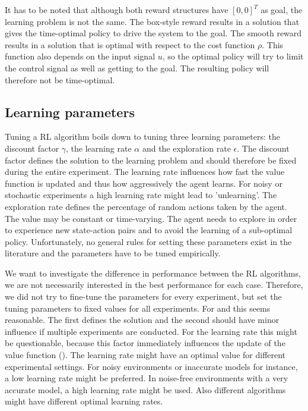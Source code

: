 It has to be noted that although both reward structures have $[0, 0]^T$ as goal, the learning problem is not the same. The box-style reward results in a solution that gives the time-optimal policy to drive the system to the goal. The smooth reward results in a solution that is optimal with respect to the cost function $\rho$. This function also depends on the input signal $u$, so the optimal policy will try to limit the control signal as well as getting to the goal. The resulting policy will therefore not be time-optimal.



\subsection{Learning parameters}\label{sec:PS-learning problem parameters}
Tuning a \ac{RL} algorithm boils down to tuning three learning parameters: the discount factor $\gamma$, the learning rate $\alpha$ and the exploration rate $\epsilon$. The discount factor defines the solution to the learning problem and should therefore be fixed during the entire experiment. The learning rate influences how fast the value function is updated and thus how aggressively the agent learns. For noisy or stochastic experiments a high learning rate might lead to 'unlearning'. The exploration rate defines the percentage of random actions taken by the agent. The value may be constant or time-varying. The agent needs to explore in order to experience new state-action pairs and to avoid the learning of a sub-optimal policy. Unfortunately, no general rules for setting these parameters exist in the literature and the parameters have to be tuned empirically. 

We want to investigate the difference in performance between the \ac{RL} algorithms, we are not necessarily interested in the best performance for each case. Therefore, we did not try to fine-tune the parameters for every experiment, but set the tuning parameters to fixed values for all experiments. For  and  this seems reasonable. The first defines the solution and the second should have minor influence if multiple experiments are conducted. For the learning rate  this might be questionable, because this factor immediately influences the update of the value function (). The learning rate might have an optimal value for different experimental settings. For noisy environments or inaccurate models for instance, a low learning rate might be preferred. In noise-free environments with a very accurate model, a high learning rate might be used. Also different algorithms might have different optimal learning rates. 

